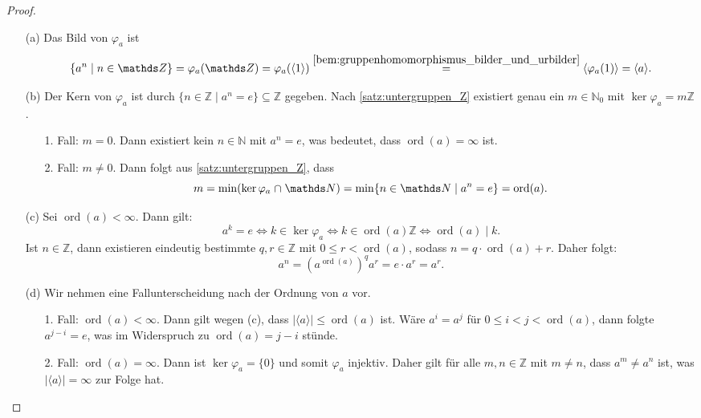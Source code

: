 \documentclass[a4paper, twoside, 11pt, ngerman]{report}
\newcommand{\NN}{\mathds N}
\newcommand{\ZZ}{\mathds Z}
\DeclareMathOperator{\ord}{ord}
\renewcommand{\cap}{\;\rotatebox{90}{\reflectbox{\rotatebox{270}{$\cup$}}}\;}
\theoremstyle{definistyle}
\theoremstyle{remark}
\begin{document}
\begin{proof}
\begin{itemize}
    \item[(a)] Das Bild von $\varphi_a$ ist
    \[
    \{a^n \mid n \in \ZZ\} = \varphi_a(\ZZ) = \varphi_a(\langle 1 \rangle) \overset{\ref{bem:gruppenhomomorphismus_bilder_und_urbilder}}{=} \langle \varphi_a(1) \rangle = \langle a \rangle.
    \]
    
    \item[(b)] Der Kern von $\varphi_a$ ist durch $\{ n \in \ZZ \mid a^n = e \} \subseteq \ZZ$ gegeben. Nach \ref{satz:untergruppen_Z} existiert genau ein $m \in \NN_0$ mit $\ker \varphi_a = m \ZZ$.
    \begin{itemize}
        \item[1. Fall:] $m = 0$. Dann existiert kein $n \in \NN$ mit $a^n = e$, was bedeutet, dass $\ord(a) = \infty$ ist.
        \item[2. Fall:] $m \neq 0$. Dann folgt aus \ref{satz:untergruppen_Z}, dass 
        \[
        m = \min (\ker \varphi_a \cap \NN) = \min \{ n \in \NN \mid a^n = e \} = \ord(a).
        \]
    \end{itemize}
    \item[(c)] Sei $\ord(a) < \infty$. Dann gilt:
\[
a^k = e \iff k\in\ker\varphi_a \iff k \in \ord(a) \ZZ \iff \ord(a) \mid k.
\]
Ist $n \in \ZZ$, dann existieren eindeutig bestimmte $q, r \in \ZZ$ mit $0 \leq r < \ord(a)$, sodass $n = q \cdot \ord(a) + r$. Daher folgt:
\[
a^n = \left(a^{\ord(a)}\right)^q a^r = e \cdot a^r = a^r.
\]

\item[(d)] Wir nehmen eine Fallunterscheidung nach der Ordnung von $a$ vor.
\begin{itemize}
    \item[1. Fall:] $\ord(a) < \infty$. Dann gilt wegen (c), dass $|\langle a \rangle| \leq \ord(a)$ ist. Wäre $a^i = a^j$ für $0 \leq i < j < \ord(a)$, dann folgte $a^{j-i} = e$, was im Widerspruch zu $\ord(a) = j - i$ stünde.
    
    \item[2. Fall:] $\ord(a) = \infty$. Dann ist $\ker \varphi_a = \{0\}$ und somit $\varphi_a$ injektiv. Daher gilt für alle $m, n \in \ZZ$ mit $m \neq n$, dass $a^m \neq a^n$ ist, was $|\langle a \rangle| = \infty$ zur Folge hat.
\end{itemize}
    
\end{itemize}
\end{proof}
\end{document}
